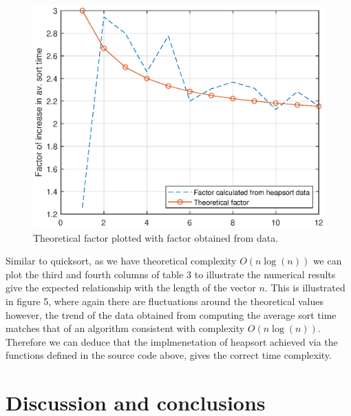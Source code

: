 \documentclass[a4paper, 12pt]{article}
\begin{document}
\begin{figure}[H]
\centering
\includegraphics[scale=0.75]{heapsort_factor}
\caption{Theoretical factor plotted with factor obtained from data.}
\end{figure}
Similar to quicksort, as we have theoretical complexity $O(n\log(n))$ we can plot the third and fourth columns of table 3 to illustrate the numerical results give the expected relationship with the length of the vector $n$. This is illustrated in figure 5, where again there are fluctuations around the theoretical values however, the trend of the data obtained from computing the average sort time matches that of an algorithm consistent with complexity $O(n\log(n))$. Therefore we can deduce that the implmenetation of heapsort achieved via the functions defined in the source code above, gives the correct time complexity. 



\section{Discussion and conclusions}
\end{document}
